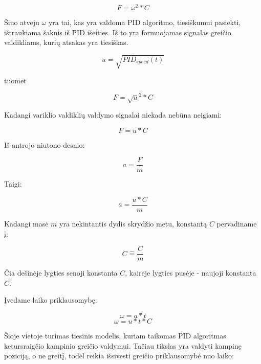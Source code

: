 \documentclass[12pt, a4paper, lithuanian, final]{article}
\begin{document}
\begin{equation}
	F = \omega^2 * C
\end{equation}

Šiuo atveju $\omega$ yra tai, kas yra valdoma PID algoritmo, tiesiškumui pasiekti, ištraukiama šaknis iš PID išeities.
Iš to yra formuojamas signalas greičio valdikliams, kurių atsakas yra tiesiškas.

\begin{equation}
	u = \sqrt{PID_{speed}(t)}
\end{equation}

tuomet

\begin{equation}
	F = \sqrt{u}^2 * C
\end{equation}

Kadangi variklio valdiklių valdymo signalai niekada nebūna neigiami:

\begin{equation}
	F = u * C
\end{equation}

Iš antrojo niutono desnio:

\begin{equation}
	a = \dfrac{F}{m}
\end{equation}

Taigi:

\begin{equation}
	a = \dfrac{u * C}{m}
\end{equation}

Kadangi masė $m$ yra nekintantis dydis skrydžio metu, konstantą $C$ pervadiname į:

\begin{equation}
	C \widehat{=} \dfrac{C}{m}
\end{equation}

Čia dešinėje lygties senoji konstanta $C$, kairėje lygties pusėje - naujoji konstanta $C$.

Įvedame laiko priklausomybę:

\begin{equation}
	\omega = a * t
\end{equation}
\begin{equation}
	\omega = u * t * C
\end{equation}

Šioje vietoje turimas tiesinis modelis, kuriam taikomas PID algoritmas ketursraigčio kampinio greičio valdymui.
Tačiau tikslas yra valdyti kampinę poziciją, o ne greitį, todėl reikia išsivesti greičio priklausomybė nuo laiko:
\end{document}
